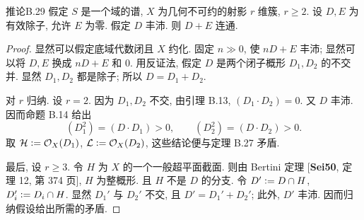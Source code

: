 \begin{origstatement}{推论}{B.29}\label{appB:29}
假定 $S$ 是一个域的谱, $X$ 为几何不可约的射影 $r$ 维簇, $r\ge2$. 设 $D,E$ 为有效除子, 允许 $E$ 为零. 假定 $D$ 丰沛. 则 $D+E$ 连通.
\end{origstatement}
\begin{proof}
显然可以假定底域代数闭且 $X$ 约化. 固定 $n\gg0$, 使 $nD+E$ 丰沛; 显然可以将 $D,E$ 换成 $nD+E$ 和 $0$. 用反证法, 假定 $D$ 是两个闭子概形 $D_1,D_2$ 的不交并. 显然 $D_1,D_2$ 都是除子; 所以 $D=D_1+D_2$.

对 $r$ 归纳. 设 $r=2$. 因为 $D_1,D_2$ 不交, 由引理 B.13, $(D_1\cdot D_2)=0$. 又 $D$ 丰沛. 因而命题 B.14 给出
\[(D_1^2)=(D\cdot D_1)>0,\qquad(D_2^2)=(D\cdot D_2)>0.\]
取 $\mathcal H\mathrel{\mathop:}=\mathcal O_X(D_1)$, $\mathcal L\mathrel{\mathop:}=\mathcal O_X(D_2)$, 这些结论便与定理 B.27 矛盾.

最后, 设 $r\ge3$. 令 $H$ 为 $X$ 的一个一般超平面截面. 则由 Bertini 定理 [\textbf{Sei50}, 定理 12, 第 374 页], $H$ 为整概形. 且 $H$ 不是 $D$ 的分支. 令 $D'\mathrel{\mathop:}= D\cap H$, $D_i'\mathrel{\mathop:}= D_i\cap H$. 显然 $D_1'$ 与 $D_2'$ 不交, 且 $D'=D_1'+D_2'$; 此外, $D'$ 丰沛. 因而归纳假设给出所需的矛盾.
\end{proof}
\endgroup
